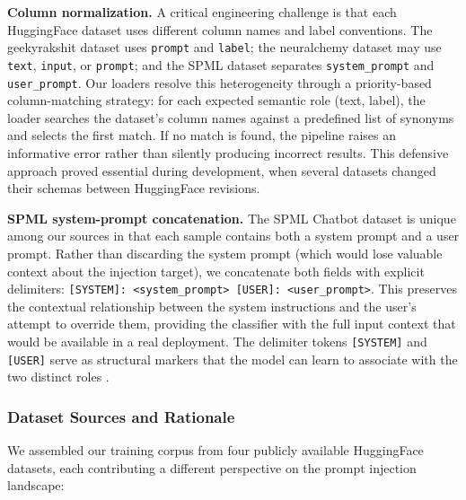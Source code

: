 \documentclass[12pt, letterpaper]{article}   %
\begin{document}
\textbf{Column normalization.} A critical engineering challenge is that each HuggingFace dataset uses different column names and label conventions. The geekyrakshit dataset uses \texttt{prompt} and \texttt{label}; the neuralchemy dataset may use \texttt{text}, \texttt{input}, or \texttt{prompt}; and the SPML dataset separates \texttt{system\_prompt} and \texttt{user\_prompt}. Our loaders resolve this heterogeneity through a priority-based column-matching strategy: for each expected semantic role (text, label), the loader searches the dataset's column names against a predefined list of synonyms and selects the first match. If no match is found, the pipeline raises an informative error rather than silently producing incorrect results. This defensive approach proved essential during development, when several datasets changed their schemas between HuggingFace revisions.

\textbf{SPML system-prompt concatenation.} The SPML Chatbot dataset is unique among our sources in that each sample contains both a system prompt and a user prompt. Rather than discarding the system prompt (which would lose valuable context about the injection target), we concatenate both fields with explicit delimiters: \texttt{[SYSTEM]: <system\_prompt> [USER]: <user\_prompt>}. This preserves the contextual relationship between the system instructions and the user's attempt to override them, providing the classifier with the full input context that would be available in a real deployment. The delimiter tokens \texttt{[SYSTEM]} and \texttt{[USER]} serve as structural markers that the model can learn to associate with the two distinct roles \cite{ref20}.

\subsubsection{Dataset Sources and Rationale}

We assembled our training corpus from four publicly available HuggingFace datasets, each contributing a different perspective on the prompt injection landscape:
\end{document}
